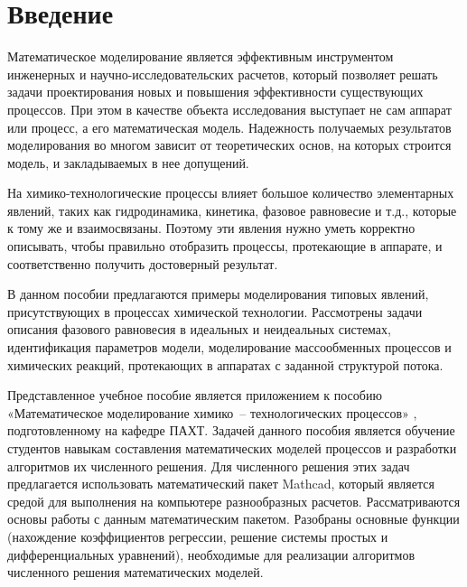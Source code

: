 \section*{Введение}
Математическое моделирование является эффективным инструментом инженерных и научно-исследовательских расчетов, который позволяет решать задачи проектирования новых и повышения эффективности существующих процессов. При этом в качестве объекта исследования выступает не сам аппарат или процесс, а его математическая модель. Надежность получаемых результатов моделирования во многом зависит от теоретических основ, на которых строится модель, и закладываемых в нее допущений.

На химико-технологические процессы влияет большое количество элементарных явлений, таких как гидродинамика, кинетика, фазовое равновесие и т.д., которые к тому же и взаимосвязаны. Поэтому эти явления нужно уметь корректно описывать, чтобы правильно отобразить процессы, протекающие в аппарате, и соответственно получить достоверный результат.

В данном пособии предлагаются примеры моделирования типовых явлений, присутствующих в процессах химической технологии. Рассмотрены задачи описания фазового равновесия в идеальных и неидеальных системах, идентификация параметров модели, моделирование массообменных процессов и химических реакций, протекающих в аппаратах с заданной структурой потока.

Представленное учебное пособие является приложением к пособию «Математическое моделирование химико~-- технологических процессов» \cite{klinov-mm2009}, подготовленному на кафедре ПАХТ. Задачей данного пособия является обучение студентов навыкам составления математических моделей процессов и разработки алгоритмов их численного решения. Для численного решения этих задач предлагается использовать математический пакет Mathcad, который является средой для выполнения на компьютере разнообразных расчетов. Рассматриваются основы работы с данным математическим пакетом. Разобраны основные функции (нахождение коэффициентов регрессии, решение системы простых и дифференциальных уравнений), необходимые для реализации алгоритмов численного решения математических моделей.